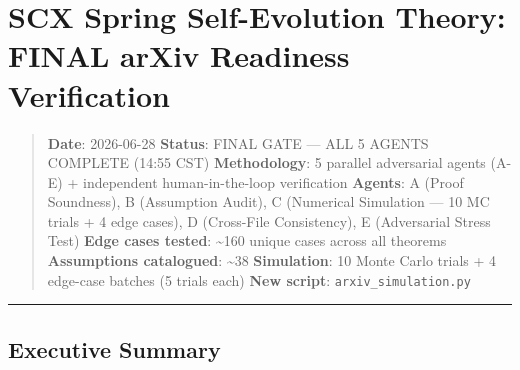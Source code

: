 \documentclass[
  12pt,
]{ctexart}
\author{SCX}
\date{2026}
\begin{document}
\section{SCX Spring Self-Evolution Theory: FINAL arXiv Readiness
Verification}\label{scx-spring-self-evolution-theory-final-arxiv-readiness-verification}

\begin{quote}
\textbf{Date}: 2026-06-28 \textbar{} \textbf{Status}: FINAL GATE --- ALL
5 AGENTS COMPLETE (14:55 CST) \textbf{Methodology}: 5 parallel
adversarial agents (A-E) + independent human-in-the-loop verification
\textbf{Agents}: A (Proof Soundness), B (Assumption Audit), C (Numerical
Simulation --- 10 MC trials + 4 edge cases), D (Cross-File Consistency),
E (Adversarial Stress Test) \textbf{Edge cases tested}:
\textasciitilde160 unique cases across all theorems \textbar{}
\textbf{Assumptions catalogued}: \textasciitilde38 \textbf{Simulation}:
10 Monte Carlo trials + 4 edge-case batches (5 trials each) \textbar{}
\textbf{New script}: \texttt{arxiv\_simulation.py}
\end{quote}

\begin{center}\rule{0.5\linewidth}{0.5pt}\end{center}

\subsection{Executive Summary}\label{executive-summary}
\end{document}
